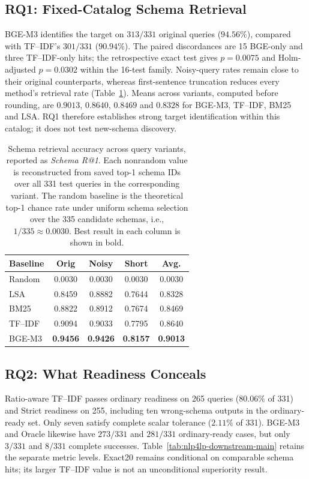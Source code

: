 \documentclass[pdflatex,iicol,sn-basic,Numbered]{sn-jnl}
\begin{document}
\subsection{RQ1: Fixed-Catalog Schema Retrieval}
\label{subsec:exp_retrieval}
BGE-M3 identifies the target on $313/331$ original queries ($94.56\%$), compared with TF--IDF's $301/331$ ($90.94\%$). The paired discordances are 15 BGE-only and three TF--IDF-only hits; the retrospective exact test gives $p=0.0075$ and Holm-adjusted $p=0.0302$ within the 16-test family. Noisy-query rates remain close to their original counterparts, whereas first-sentence truncation reduces every method's retrieval rate (Table~\ref{tab:nlp4lp-retrieval-main}). Means across variants, computed before rounding, are $0.9013$, $0.8640$, $0.8469$ and $0.8328$ for BGE-M3, TF--IDF, BM25 and LSA. RQ1 therefore establishes strong target identification within this catalog; it does not test new-schema discovery.

\begin{table}[t]
  \centering
  \renewcommand{\arraystretch}{1.18}
  \caption{Schema retrieval accuracy across query variants, reported as \textit{Schema R@1}. Each nonrandom value is reconstructed from saved top-1 schema IDs over all 331 test queries in the corresponding variant. The random baseline is the theoretical top-1 chance rate under uniform schema selection over the 335 candidate schemas, i.e., $1/335 \approx 0.0030$. Best result in each column is shown in bold.}
  \label{tab:nlp4lp-retrieval-main}
  \small
  \setlength{\tabcolsep}{3pt}
  \begin{tabular}{lcccc}
    \toprule
    Baseline & Orig & Noisy & Short & Avg. \\
    \midrule
    Random  & 0.0030 & 0.0030 & 0.0030 & 0.0030 \\
    LSA     & 0.8459 & 0.8882 & 0.7644 & 0.8328 \\
    BM25    & 0.8822 & 0.8912 & 0.7674 & 0.8469 \\
    TF--IDF & 0.9094 & 0.9033 & 0.7795 & 0.8640 \\
    BGE-M3 & \textbf{0.9456} & \textbf{0.9426} & \textbf{0.8157} & \textbf{0.9013} \\
    \bottomrule
  \end{tabular}
\end{table}

\subsection{RQ2: What Readiness Conceals}
\label{subsec:exp_downstream}
Ratio-aware TF--IDF passes ordinary readiness on 265 queries ($80.06\%$ of 331) and Strict readiness on 255, including ten wrong-schema outputs in the ordinary-ready set. Only seven satisfy complete scalar tolerance ($2.11\%$ of 331). BGE-M3 and Oracle likewise have $273/331$ and $281/331$ ordinary-ready cases, but only $3/331$ and $8/331$ complete successes. Table~\ref{tab:nlp4lp-downstream-main} retains the separate metric levels. Exact20 remains conditional on comparable schema hits; its larger TF--IDF value is not an unconditional superiority result.
\end{document}
